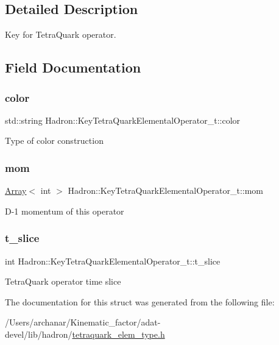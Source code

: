 \subsection{Detailed Description}
Key for Tetra\+Quark operator. 

\subsection{Field Documentation}
\mbox{\label{structHadron_1_1KeyTetraQuarkElementalOperator__t_aeb7ad2a91c69b04ed9b3b37d20be1ffe}} 
\subsubsection{\texorpdfstring{color}{color}}
{\footnotesize\ttfamily std\+::string Hadron\+::\+Key\+Tetra\+Quark\+Elemental\+Operator\+\_\+t\+::color}

Type of color construction \mbox{\label{structHadron_1_1KeyTetraQuarkElementalOperator__t_a722fb3cb3ff844a07f67d0fc0d5e507d}} 
\subsubsection{\texorpdfstring{mom}{mom}}
{\footnotesize\ttfamily \mbox{\hyperlink{classXMLArray_1_1Array}{Array}}$<$ int $>$ Hadron\+::\+Key\+Tetra\+Quark\+Elemental\+Operator\+\_\+t\+::mom}

D-\/1 momentum of this operator \mbox{\label{structHadron_1_1KeyTetraQuarkElementalOperator__t_a3375660f000fa53b1c942e36e8f43cb8}} 
\subsubsection{\texorpdfstring{t\_slice}{t\_slice}}
{\footnotesize\ttfamily int Hadron\+::\+Key\+Tetra\+Quark\+Elemental\+Operator\+\_\+t\+::t\+\_\+slice}

Tetra\+Quark operator time slice 

The documentation for this struct was generated from the following file\+:\begin{DoxyCompactItemize}
\item 
/\+Users/archanar/\+Kinematic\+\_\+factor/adat-\/devel/lib/hadron/\mbox{\hyperlink{adat-devel_2lib_2hadron_2tetraquark__elem__type_8h}{tetraquark\+\_\+elem\+\_\+type.\+h}}\end{DoxyCompactItemize}
